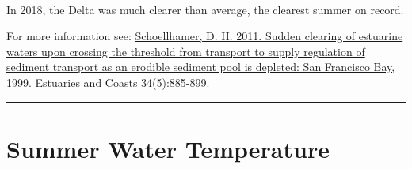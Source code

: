 \documentclass[
]{book}
\begin{document}
\begin{panel-grid}
\begin{columns-nocenter}
\begin{column800}
\end{column800}

\begin{column40}

~

\end{column40}

\begin{column800}

In 2018, the Delta was much clearer than average, the clearest summer on record.

\end{column800}

\end{columns-nocenter}

\end{panel-grid}

\begin{disclaimer}
For more information see:
\href{https://link.springer.com/article/10.1007/s12237-011-9382-x}{Schoellhamer,
D. H. 2011. Sudden clearing of estuarine waters upon crossing the
threshold from transport to supply regulation of sediment transport as
an erodible sediment pool is depleted: San Francisco Bay, 1999.
Estuaries and Coasts 34(5):885-899.}
\end{disclaimer}

\begin{center}\rule{0.5\linewidth}{0.5pt}\end{center}

\hypertarget{summer-water-temperature}{%
\section{Summer Water Temperature}\label{summer-water-temperature}}
\end{document}
